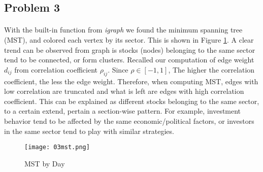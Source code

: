 \subsection*{Problem 3}
\paragraph{}
With the built-in function from \textit{igraph} we found the minimum spanning tree (MST), and colored each vertex by its sector. This is shown in Figure \ref{fig:03mst}. A clear trend can be observed from graph is stocks (nodes) belonging to the same sector tend to be connected, or form clusters. Recalled our computation of edge weight $d_{ij}$ from correlation coefficient $\rho_{ij}$. Since $\rho \in [-1, 1]$, The higher the correlation coefficient, the less the edge weight. Therefore, when computing MST, edges with low correlation are truncated and what is left are edges with high correlation coefficient. This can be explained as different stocks belonging to the same sector, to a certain extend, pertain a section-wise pattern. For example, investment behavior tend to be affected by the same economic/political factors, or investors in the same sector tend to play with similar strategies.

\begin{figure}[h!]
	\centering
	\texttt{[image: 03mst.png]}
	\caption{MST by Day}	
	\label{fig:03mst} 
\end{figure}

